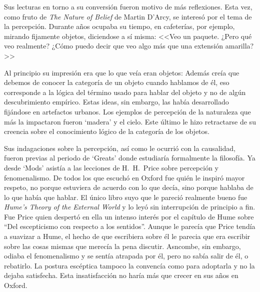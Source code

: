 
Sus lecturas en torno a su conversión fueron motivo de más reflexiones. Esta vez, como fruto de \emph{The Nature of Belief} de Martin D'Arcy, se interesó por el tema de la percepción. Durante años ocupaba su tiempo, en cafeterías, por ejemplo, mirando fijamente objetos, diciendose a sí misma: <<Veo un paquete. ¿Pero qué veo realmente? ¿Cómo puedo decir que veo algo más que una extensión amarilla?>>\autocite[cf.~][p.~viii]{anscombe1981metaphysicsintro}

  Al principio su impresión era que lo que veía eran objetos: \autocite[p.~viii]{anscombe1981metaphysicsintro} Además creía que debemos de conocer la categoría de un objeto cuando hablamos de él, eso corresponde a la lógica del término usado para hablar del objeto y no de algún descubrimiento empírico. Estas ideas, sin embargo, las había desarrollado fijándose en artefactos urbanos. Los ejemplos de percepción de la naturaleza que más la impactaron fueron `madera' y el cielo. Este último le hizo retractarse de su creencia sobre el conocimiento lógico de la categoría de los objetos.\autocite[cf.~][p.~viii]{anscombe1981metaphysicsintro}

  Sus indagaciones sobre la percepción, así como le ocurrió con la causalidad, fueron previas al periodo de `Greats' donde estudiaría formalmente la filosofía. Ya desde `Mods' asistía a las lecciones de H.~H.~Price sobre percepción y fenomenalismo. De todos los que escuchó en Oxford fue quién le inspiró mayor respeto, no porque estuviera de acuerdo con lo que decía, sino porque hablaba de lo que había que hablar. El único libro suyo que le pareció realmente bueno fue \emph{Hume's Theory of the External World} y lo leyó sin interrupción de principio a fin. Fue Price quien despertó en ella un intenso interés por el capítulo de Hume sobre ``Del escepticismo con respecto a los sentidos''. Aunque le parecía que Price tendía a suavizar a Hume, el hecho de que escribiera sobre él le parecia que era escribir sobre las cosas mismas que merecía la pena discutir. Asncombe, sin embargo, odiaba el fenomenalismo y se sentía atrapada por él, pero no sabía salir de él, o rebatirlo. La postura escéptica tampoco la convencía como para adoptarla y no la dejaba satisfecha. Esta insatisfacción no haría más que crecer en sus años en Oxford. \autocites[cf.~][p.~viii]{anscombe1981metaphysicsintro} [~y~][p.~26]{torralba2005accion}

